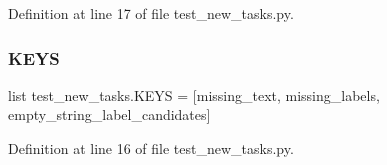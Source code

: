 Definition at line 17 of file test\+\_\+new\+\_\+tasks.\+py.

\mbox{\label{namespacetest__new__tasks_a78b0338511b7541b8771ad9d6c223fb7}} 
\subsubsection{\texorpdfstring{K\+E\+YS}{KEYS}}
{\footnotesize\ttfamily list test\+\_\+new\+\_\+tasks.\+K\+E\+YS = \mbox{[}\textquotesingle{}missing\+\_\+text\textquotesingle{}, \textquotesingle{}missing\+\_\+labels\textquotesingle{}, \textquotesingle{}empty\+\_\+string\+\_\+label\+\_\+candidates\textquotesingle{}\mbox{]}}



Definition at line 16 of file test\+\_\+new\+\_\+tasks.\+py.

